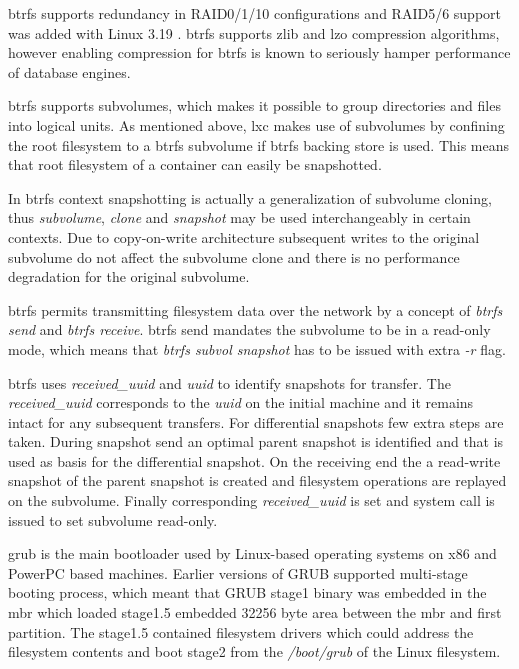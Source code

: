 \documentclass[a4paper,11pt]{kth-mag}
\begin{document}
\acrshort{btrfs} supports redundancy in RAID0/1/10 configurations and
RAID5/6 support was added with Linux 3.19 \cite{btrfs-for-3.19}.
\acrshort{btrfs} supports zlib and lzo compression algorithms,
however enabling compression for \acrshort{btrfs} is known to
seriously hamper performance of database engines.

\acrshort{btrfs} supports subvolumes, which makes it possible to group
directories and files into logical units.
As mentioned above, \acrshort{lxc} makes use of subvolumes
by confining the root filesystem to a \acrshort{btrfs} subvolume
if \acrshort{btrfs} backing store is used.
This means that root filesystem of a container
can easily be snapshotted.

In \acrshort{btrfs} context snapshotting is actually
a generalization of subvolume cloning,
thus \emph{subvolume}, \emph{clone} and \emph{snapshot} may be used
interchangeably in certain contexts.
Due to copy-on-write architecture subsequent writes
to the original subvolume do not affect
the subvolume clone and there is no performance
degradation for the original subvolume.

\acrshort{btrfs} permits transmitting filesystem data over the network
by a concept of \emph{btrfs send} and \emph{btrfs receive}.
\acrshort{btrfs} send mandates the subvolume to be in a read-only mode,
which means that \emph{btrfs subvol snapshot} has to be issued
with extra \emph{-r} flag.


\acrshort{btrfs} uses \emph{received\_uuid} and \emph{uuid} to
identify snapshots for transfer.
The \emph{received\_uuid} corresponds to the \emph{uuid} on
the initial machine and it remains intact for any subsequent transfers.
For differential snapshots few extra steps are taken.
During snapshot send an optimal parent snapshot is
identified and that is used as basis for the differential snapshot.
On the receiving end the a read-write snapshot of the parent
snapshot is created and filesystem operations
are replayed on the subvolume.
Finally corresponding \emph{received\_uuid} is set and
system call is issued to set subvolume read-only.


\acrfull{grub}
is the main bootloader used
by Linux-based operating systems on x86 and PowerPC based machines.
Earlier versions of GRUB supported multi-stage booting process,
which meant that GRUB stage1 binary was embedded in the
\acrfull{mbr} which loaded stage1.5 embedded
32256 byte area between the \acrshort{mbr} and first partition.
The stage1.5 contained filesystem drivers which could
address the filesystem contents and boot stage2 from
the \emph{/boot/grub} of the Linux filesystem.
\cite{grub2-fails-to-install}
\end{document}
